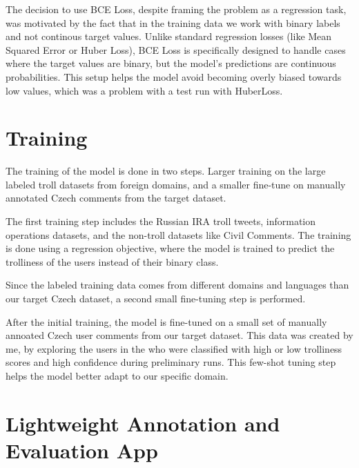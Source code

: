\documentclass[twoside]{ctuthesis}
\theoremstyle{plain}
\theoremstyle{definition}
\theoremstyle{note}
\begin{document}
The decision to use BCE Loss, despite framing the problem as a regression task, was motivated by the fact that in the training data we work with binary labels and not continous target values. Unlike standard regression losses (like Mean Squared Error or Huber Loss), BCE Loss is specifically designed to handle cases where the target values are binary, but the model's predictions are continuous probabilities. This setup helps the model avoid becoming overly biased towards low values, which was a problem with a test run with HuberLoss.\par 

\section{Training}
The training of the model is done in two steps. Larger training on the large labeled troll datasets from foreign domains, and a smaller fine-tune on manually annotated Czech comments from the target dataset.\par
The first training step includes the Russian IRA troll tweets, information operations datasets, and the non-troll datasets like Civil Comments. The training is done using a regression objective, where the model is trained to predict the trolliness of the users instead of their binary class.\par
Since the labeled training data comes from different domains and languages than our target Czech dataset, a second small fine-tuning step is performed.\par
After the initial training, the model is fine-tuned on a small set of manually annoated Czech user comments from our target dataset. This data was created by me, by exploring the users in the who were classified with high or low trolliness scores and high confidence during preliminary runs. This few-shot tuning step helps the model better adapt to our specific domain.\par

\section{Lightweight Annotation and Evaluation App}
\end{document}
